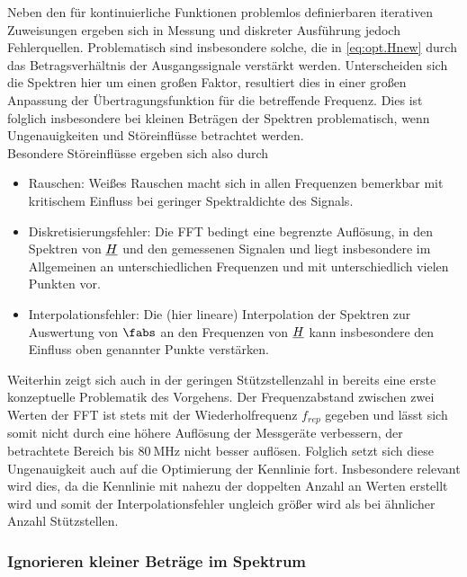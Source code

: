 \documentclass[../Report.tex]{subfiles}
\begin{document}
 
Neben den für kontinuierliche Funktionen problemlos definierbaren iterativen Zuweisungen ergeben sich in Messung und diskreter Ausführung jedoch Fehlerquellen. Problematisch sind insbesondere solche, die in \eqref{eq:opt.Hnew} durch das Betragsverhältnis der Ausgangssignale verstärkt werden. 
Unterscheiden sich die Spektren hier um einen großen Faktor, resultiert dies in einer großen Anpassung der Übertragungsfunktion für die betreffende Frequenz. Dies ist folglich insbesondere bei kleinen Beträgen der Spektren problematisch, wenn Ungenauigkeiten und Störeinflüsse betrachtet werden. 
\\
Besondere Störeinflüsse ergeben sich also durch
\begin{itemize}
	\item Rauschen: Weißes Rauschen macht sich in allen Frequenzen bemerkbar mit kritischem Einfluss bei geringer Spektraldichte des Signals.
	
	\item Diskretisierungsfehler: Die FFT bedingt eine begrenzte Auflösung, in den Spektren von $\underline{H}$ und den gemessenen Signalen und liegt insbesondere im Allgemeinen an unterschiedlichen Frequenzen und mit unterschiedlich vielen Punkten vor.
	
	\item Interpolationsfehler: Die (hier lineare) Interpolation der Spektren zur Auswertung von $\fabs$ an den Frequenzen von $\underline{H}$ kann insbesondere den Einfluss oben genannter Punkte verstärken.
\end{itemize}

Weiterhin zeigt sich auch in der geringen Stützstellenzahl in  bereits eine erste konzeptuelle Problematik des Vorgehens. Der Frequenzabstand zwischen zwei Werten der FFT ist stets mit der Wiederholfrequenz $f_{rep}$ gegeben und lässt sich somit nicht durch eine höhere Auflösung der Messgeräte verbessern, der betrachtete Bereich bis $\SI{80}{\MHz}$ nicht besser auflösen.
Folglich setzt sich diese Ungenauigkeit auch auf die Optimierung der Kennlinie fort. Insbesondere relevant wird dies, da die Kennlinie mit nahezu der doppelten Anzahl an Werten erstellt wird und somit der Interpolationsfehler ungleich größer wird als bei ähnlicher Anzahl Stützstellen.


\subsubsection*{Ignorieren kleiner Beträge im Spektrum}
\label{subsubsec:opt.H.prom}
\end{document}
